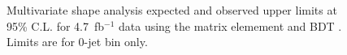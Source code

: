 \begin{figure}[!hbtp]
\centering
{}
\caption{ 
Multivariate shape analysis expected and observed upper limits at 95\% C.L. for 4.7~fb$^{-1}$ data using the 
matrix elemement  and BDT . Limits are for 0-jet bin only. } 
\label{fig:me_expected_5fb}
\end{figure}


